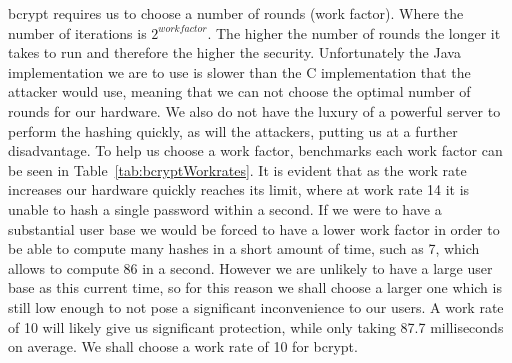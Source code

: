 \documentclass[12pt, titlepage]{article}
\begin{document}
\newline \indent bcrypt requires us to choose a number of rounds (work factor). Where the number of iterations is $2^{workfactor}$. The higher the number of rounds the longer it takes to run and therefore the higher the security. Unfortunately the Java implementation we are to use is slower than the C implementation that the attacker would use, meaning that we can not choose the optimal number of rounds for our hardware. We also do not have the luxury of a powerful server to perform the hashing quickly, as will the attackers, putting us at a further disadvantage. To help us choose a work factor, benchmarks each work factor can be seen in Table~\ref{tab:bcryptWorkrates}. It is evident that as the work rate increases our hardware quickly reaches its limit, where at work rate 14 it is unable to hash a single password within a second. If we were to have a substantial user base we would be forced to have a lower work factor in order to be able to compute many hashes in a short amount of time, such as 7, which allows to compute 86 in a second. However we are unlikely to have a large user base as this current time, so for this reason we shall choose a larger one which is still low enough to not pose a significant inconvenience to our users. A work rate of 10 will likely give us significant protection, while only taking 87.7 milliseconds on average. We shall choose a work rate of 10 for bcrypt.
\end{document}
